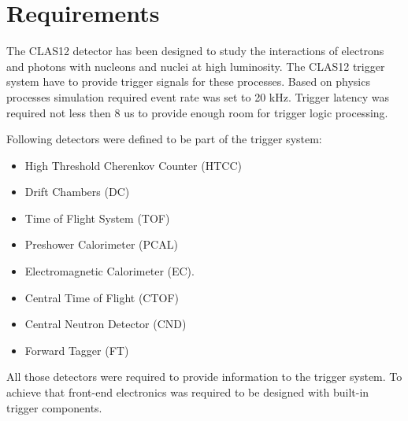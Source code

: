 \section{Requirements}

The CLAS12 detector  has been designed to study the interactions of electrons and photons with nucleons and nuclei at high luminosity. The CLAS12 trigger system have to provide trigger signals for these processes. Based on physics processes simulation required event rate was set to 20 kHz. Trigger latency was required not less then 8 us to provide enough room for trigger logic processing.


Following detectors were defined to be part of the trigger system:

\begin{itemize}
	\item High Threshold Cherenkov Counter (HTCC)
	\item Drift Chambers (DC)
	\item Time of Flight System (TOF)
	\item Preshower Calorimeter (PCAL)
	\item Electromagnetic Calorimeter (EC).
	\item Central Time of Flight (CTOF)
	\item Central Neutron Detector (CND)
	\item Forward Tagger (FT)
\end{itemize}

All those detectors were required to provide information to the trigger system. To achieve that front-end electronics was required to be designed with built-in trigger components. 

 
